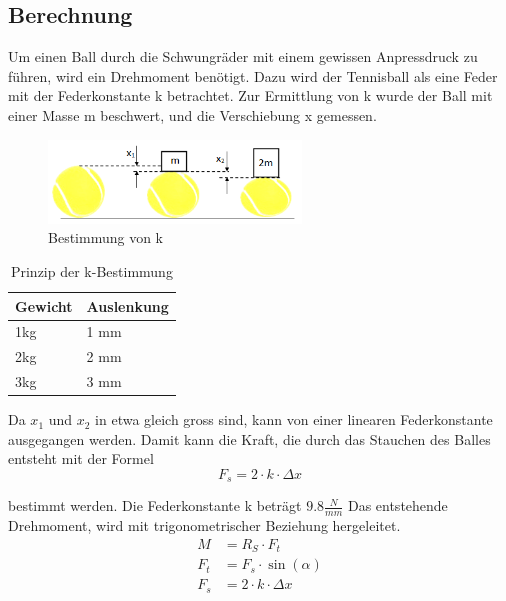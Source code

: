 \subsection{Berechnung}
Um einen Ball durch die Schwungräder mit einem gewissen Anpressdruck zu führen, wird ein
Drehmoment benötigt. Dazu wird der Tennisball als eine Feder mit der Federkonstante k betrachtet. Zur Ermittlung von k wurde der Ball mit einer Masse m
beschwert, und die Verschiebung x gemessen.

\begin{figure}[h!]
	\centering
	\includegraphics[width=0.6\textwidth]{Enddokumentation/Anhang/Bilder/KompressionBaelle.png}
	\caption{Bestimmung von k}
	\label{fig:BallKomp}
\end{figure}

\begin{table}[h!]
	\begin{tabular}{p{1.5cm}p{1.7cm}}
		Gewicht & Auslenkung\\
		\hline
		1kg & 1 mm\\
		2kg & 2 mm\\
		3kg & 3 mm\\
	\end{tabular}
	\centering
	\caption{Prinzip der k-Bestimmung}
	\label{tab:BallKompErgebnis}
\end{table}

Da $x_1$ und $x_2$ in etwa gleich gross sind, kann von einer linearen Federkonstante
ausgegangen werden. Damit kann die Kraft, die durch das Stauchen des Balles entsteht mit der
Formel
\begin{equation}  
    F_s=2\cdot k \cdot \Delta x 
\end{equation}

bestimmt werden. Die Federkonstante k beträgt $9.8\frac{N}{mm}$ Das entstehende Drehmoment,
wird mit trigonometrischer Beziehung hergeleitet.
\begin{align}  
    \label{equ:Formel_M} %
    M &= R_S \cdot F_t\\
    F_t &= F_s \cdot \sin(\alpha)\\ 
    F_s &= 2\cdot k \cdot \Delta x 
\end{align}

